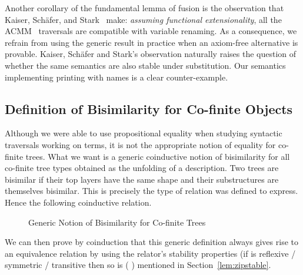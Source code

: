 {Another corollary of the fundamental lemma of fusion is the observation that
Kaiser, Schäfer, and Stark~\citeyear{Kaiser-wsdebr} make: \emph{assuming
functional extensionality}, all the ACMM~\citeyear{allais2017type} traversals
are compatible with variable renaming.
As a consequence, we refrain from using the generic result in practice when
an axiom-free alternative is provable. Kaiser, Schäfer and Stark's observation
naturally raises the question of whether the same semantics are also stable
under substitution. Our semantics implementing printing with names is a clear
counter-example.



\subsection{Definition of Bisimilarity for Co-finite Objects}

Although we were able to use propositional equality when studying
syntactic traversals working on terms, it is not the appropriate
notion of equality for co-finite trees. What we want is a generic
coinductive notion of bisimilarity for all co-finite tree types
obtained as the unfolding of a description. Two trees are bisimilar
if their top layers have the same shape and their substructures are
themselves bisimilar. This is precisely the type of relation 
was defined to express. Hence the following coinductive relation.

\begin{figure}[h]
\caption{Generic Notion of Bisimilarity for Co-finite Trees}
\end{figure}

We can then prove by coinduction that this generic definition always gives
rise to an equivalence relation by using the relator's stability properties
(if  is reflexive / symmetric / transitive then so is {(   )}
mentioned in Section~\ref{lem:zipstable}.

}
